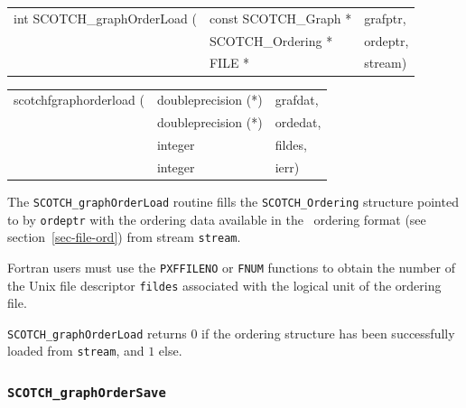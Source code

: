 \begin{itemize}
\progsyn

{\tt\begin{tabular}{l@{}ll}
int SCOTCH\_graphOrderLoad ( & const SCOTCH\_Graph * & grafptr, \\
                             & SCOTCH\_Ordering *    & ordeptr, \\
                             & FILE *                & stream)
\end{tabular}}

{\tt\begin{tabular}{l@{}ll}
scotchfgraphorderload ( & doubleprecision (*) & grafdat, \\
                        & doubleprecision (*) & ordedat, \\
                        & integer             & fildes,  \\
                        & integer             & ierr)
\end{tabular}}

\progdes

The {\tt SCOTCH\_graphOrderLoad} routine fills the
{\tt SCOTCH\_\lbt Ordering} structure pointed to by
{\tt ordeptr} with the ordering data available in
the \scotch\ ordering format (see section~\ref{sec-file-ord})
from stream {\tt stream}.

Fortran users must use the {\tt PXFFILENO} or {\tt FNUM} functions to
obtain the number of the Unix file descriptor {\tt fildes} associated
with the logical unit of the ordering file.

\progret

{\tt SCOTCH\_graphOrderLoad} returns $0$ if the ordering structure
has been successfully loaded from {\tt stream}, and $1$ else.
\end{itemize}

\subsubsection{{\tt SCOTCH\_graphOrderSave}}

